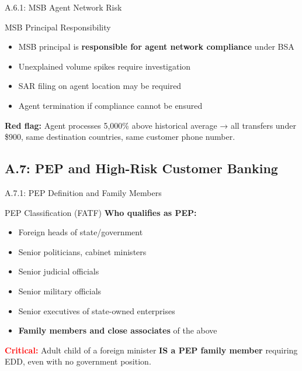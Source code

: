\documentclass{beamer}
\begin{document}
	\begin{frame}{A.6.1: MSB Agent Network Risk}
		\begin{block}{MSB Principal Responsibility}
			\begin{itemize}
				\item MSB principal is \textbf{responsible for agent network compliance} under BSA
				\item Unexplained volume spikes require investigation
				\item SAR filing on agent location may be required
				\item Agent termination if compliance cannot be ensured
			\end{itemize}
		\end{block}
		\textbf{Red flag:} Agent processes 5,000\% above historical average → all transfers under \$900, same destination countries, same customer phone number.
	\end{frame}
	
	\subsection{A.7: PEP and High-Risk Customer Banking}
	
	\begin{frame}{A.7.1: PEP Definition and Family Members}
		\begin{block}{PEP Classification (FATF)}
			\textbf{Who qualifies as PEP:}
			\begin{itemize}
				\item Foreign heads of state/government
				\item Senior politicians, cabinet ministers
				\item Senior judicial officials
				\item Senior military officials
				\item Senior executives of state-owned enterprises
				\item \textbf{Family members and close associates} of the above
			\end{itemize}
		\end{block}
		\textcolor{red}{\textbf{Critical:}} Adult child of a foreign minister \textbf{IS a PEP family member} requiring EDD, even with no government position.
	\end{frame}
	
\end{document}
